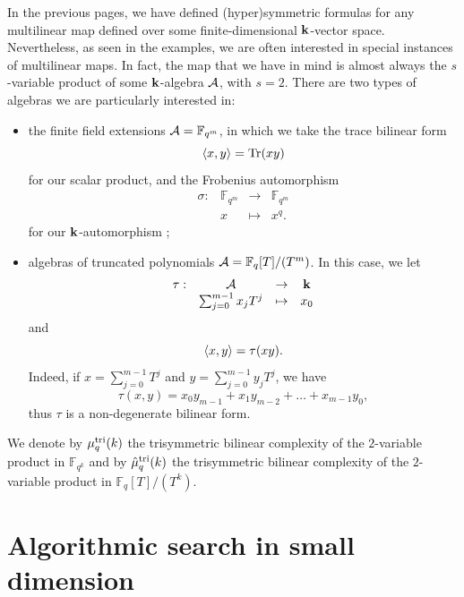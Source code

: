 In the previous pages, we have defined (hyper)symmetric formulas for any
multilinear map defined over some finite-dimensional $\mathbf{k}$-vector space.
Nevertheless, as seen in the examples, we are often interested in special
instances of multilinear maps. In fact, the map that we have in mind is almost
always the $s$-variable product of some $\mathbf{k}$-algebra $\mathcal{A}$, with $s=2$. There are
two types of algebras we are particularly interested in:
\begin{itemize}
  \item the finite field extensions $\mathcal{A}=\mathbb{F}_{q^m}$, in which we take the
    trace bilinear form
    \[
      \left\langle x,y\right\rangle=\operatorname{Tr}(xy)
    \]
    for our scalar product, and the Frobenius automorphism
    \[
  \begin{array}{cccc}
    \sigma: & \mathbb{F}_{q^m} & \to & \mathbb{F}_{q^m} \\
    & x & \mapsto & x^q.
  \end{array}
\]
for our $\mathbf{k}$-automorphism ;
\item algebras of truncated polynomials $\mathcal{A} = \mathbb{F}_q[T]/(T^m)$. In this
  case, we let 
  \[
  \begin{array}{cccc}
    \tau: & \mathcal{A} & \to & \mathbf{k} \\
    & \sum_{j=0}^{m-1}x_j T^j & \mapsto & x_0
  \end{array}
\]
and
\[
  \left\langle x,y\right\rangle = \tau(xy).
\]
Indeed, if $x=\sum_{j=0}^{m-1}T^j$ and $y=\sum_{j=0}^{m-1}y_jT^j$, we have
\[
  \tau(x, y) = x_0y_{m-1} + x_1y_{m-2} + \dots + x_{m-1}y_0,
\]
thus $\tau$ is a non-degenerate bilinear form.
\end{itemize}
We denote by $\mu^{\textrm{tri}}_q(k)$ the trisymmetric bilinear complexity of the
$2$-variable product in $\mathbb{F}_{q^k}$ and by $\hat\mu^{\textrm{tri}}_q(k)$ the
trisymmetric bilinear complexity of the $2$-variable product in
$\mathbb{F}_q[T]/(T^k)$.

\section{Algorithmic search in small dimension}


